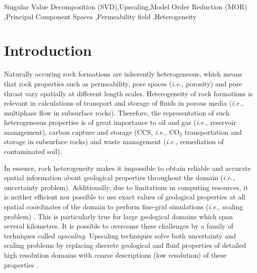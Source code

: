 \documentclass[preprint,12pt]{elsarticle}
\newcommand{\ie}{{\it i.e., }}
\begin{document}
\begin{frontmatter}
\begin{abstract}
\end{abstract}



\begin{keyword} %
Singular Value Decomposition (SVD)\sep Upscaling\sep Model Order Reduction (MOR) \sep  Principal Component Spaces \sep Permeability field \sep Heterogeneity
\end{keyword}
 
\end{frontmatter}

\section{Introduction}\label{section:intro}
Naturally occuring rock formations are inherently heterogeneous, which means that rock properties such as permeability, pore spaces (\ie porosity) and pore throat vary spatially at different length scales. Heterogeneity of rock formations is relevant in calculations of transport and storage of fluids in porous media (\ie multiphase flow in subsurface rocks). Therefore, the representation of such heterogeneous properties is of great importance to oil and gas (\ie reservoir management), carbon capture and storage (CCS, \ie CO$_2$ transportation and storage in subsurface rocks) and waste management (\ie remediation of contaminated soil).

In essence, rock heterogeneity makes it impossible to obtain reliable and accurate spatial information about geological properties throughout the domain (\ie uncertainty problem). Additionally, due to limitations in computing resources, it is neither efficient nor possible to use exact values of geological properties at all spatial coordinates of the domain to perform fine-grid simulations (\ie scaling problem) \cite{chen_2006,miller_1998,Renard_1997}. This is particularly true for large geological domains which span several kilometres. It is possible to overcome these challenges by a family of techniques called {\it upscaling}. Upscaling techniques solve both uncertainty and scaling problems by replacing discrete geological and fluid properties of detailed high resolution domains with coarse descriptions (low resolution) of these properties \cite{Vereecken_2007}.
\end{document}
